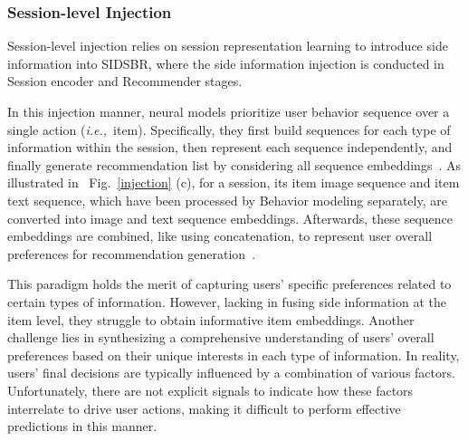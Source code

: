 \documentclass[lettersize,journal]{IEEEtran}
\newcommand{\ie}{\emph{i.e.,}\xspace}
\newcommand{\fig}{Fig.\xspace}
\newcommand{\baby}{{SIDSBR}\xspace}
\begin{document}
\subsubsection{Session-level Injection}
Session-level injection relies on session representation learning to introduce side information into \baby, where the side information injection is conducted in Session encoder and Recommender stages.

In this injection manner, neural models prioritize user behavior sequence over a single action (\ie~item). Specifically, they first build sequences for each type of information within the session, then represent each sequence independently, and finally generate recommendation list by considering all sequence embeddings~\cite{Zhou@CIKM2020,song@CIKM2021,MMMLP}. As illustrated in ~\fig~\ref{injection} (c), for a session, its item image sequence and item text sequence, which have been processed by Behavior modeling separately, are converted into image and text sequence embeddings. Afterwards, these sequence embeddings are combined, like using concatenation, to represent user overall preferences for recommendation generation~\cite{zhang@IJCAI2019,WW@TKDE2023}.

This paradigm holds the merit of capturing users' specific preferences related to certain types of information. However, lacking in fusing side information at the item level, they struggle to obtain informative item embeddings. Another challenge lies in synthesizing a comprehensive understanding of users' overall preferences based on their unique interests in each type of information. In reality, users' final decisions are typically influenced by a combination of various factors. Unfortunately, there are not explicit signals to indicate how these factors interrelate to drive user actions, making it difficult to perform effective predictions in this manner. 

\end{document}
